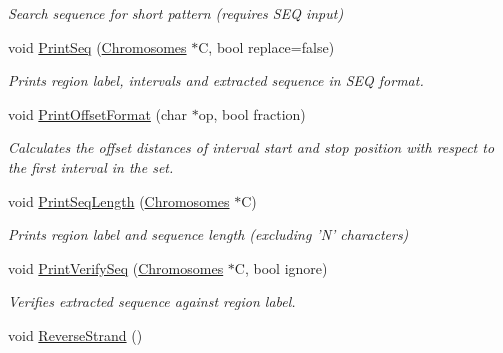 \begin{DoxyCompactItemize}
\begin{DoxyCompactList}\small\item\em Search sequence for short pattern (requires SEQ input) \end{DoxyCompactList}\item 
\hypertarget{classGenomicRegion_a4b52d78052e0109b1fceafe450cfdedd}{
void \hyperlink{classGenomicRegion_a4b52d78052e0109b1fceafe450cfdedd}{PrintSeq} (\hyperlink{classChromosomes}{Chromosomes} $\ast$C, bool replace=false)}
\label{classGenomicRegion_a4b52d78052e0109b1fceafe450cfdedd}

\begin{DoxyCompactList}\small\item\em Prints region label, intervals and extracted sequence in SEQ format. \end{DoxyCompactList}\item 
void \hyperlink{classGenomicRegion_a33d1e5544b3fb81e8c19468b91920b1d}{PrintOffsetFormat} (char $\ast$op, bool fraction)
\begin{DoxyCompactList}\small\item\em Calculates the offset distances of interval start and stop position with respect to the first interval in the set. \end{DoxyCompactList}\item 
\hypertarget{classGenomicRegion_a7a8ac4f469447256253bdbdcb1b4a956}{
void \hyperlink{classGenomicRegion_a7a8ac4f469447256253bdbdcb1b4a956}{PrintSeqLength} (\hyperlink{classChromosomes}{Chromosomes} $\ast$C)}
\label{classGenomicRegion_a7a8ac4f469447256253bdbdcb1b4a956}

\begin{DoxyCompactList}\small\item\em Prints region label and sequence length (excluding 'N' characters) \end{DoxyCompactList}\item 
\hypertarget{classGenomicRegion_a77fa696d55d538b365d15a7a30391132}{
void \hyperlink{classGenomicRegion_a77fa696d55d538b365d15a7a30391132}{PrintVerifySeq} (\hyperlink{classChromosomes}{Chromosomes} $\ast$C, bool ignore)}
\label{classGenomicRegion_a77fa696d55d538b365d15a7a30391132}

\begin{DoxyCompactList}\small\item\em Verifies extracted sequence against region label. \end{DoxyCompactList}\item 
\hypertarget{classGenomicRegion_a9304039f70c5110b961cc9de77974d09}{
void \hyperlink{classGenomicRegion_a9304039f70c5110b961cc9de77974d09}{ReverseStrand} ()}
\label{classGenomicRegion_a9304039f70c5110b961cc9de77974d09}


\end{DoxyCompactItemize}
